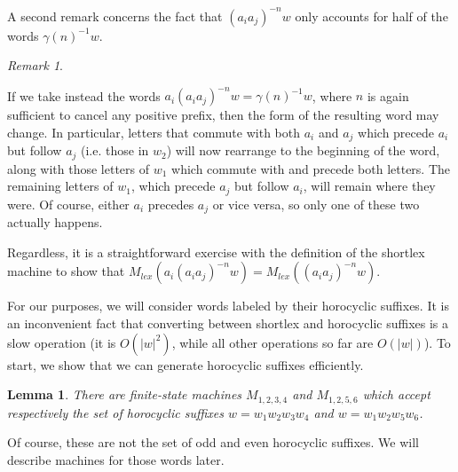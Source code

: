 \documentclass[10pt,a4paper]{amsart}
\newtheorem{lemma}[theorem]{Lemma}
\theoremstyle{definition}
\theoremstyle{remark}
\newtheorem{remark}[theorem]{Remark}
\begin{document}
	A second remark concerns the fact that $(a_ia_j)^{-n}w$ only accounts for half of the words $\gamma(n)^{-1}w$.
	
	\begin{remark}\label{FullConvergence}
		
		If we take instead the words $a_i (a_ia_j)^{-n}w = \gamma(n)^{-1}w$, where $n$ is again sufficient to cancel any positive prefix, then the form of the resulting word may change. In particular, letters that commute with both $a_i$ and $a_j$ which precede $a_i$ but follow $a_j$ (i.e. those in $w_2$) will now rearrange to the beginning of the word, along with those letters of $w_1$ which commute with and precede both letters. The remaining letters of $w_1$, which precede $a_j$ but follow $a_i$, will remain where they were. Of course, either $a_i$ precedes $a_j$ or vice versa, so only one of these two actually happens.
		
		Regardless, it is a straightforward exercise with the definition of the shortlex machine to show that $M_{lex}(a_i (a_ia_j)^{-n}w) = M_{lex}((a_ia_j)^{-n}w)$.
		
	\end{remark}
	
	For our purposes, we will consider words labeled by their horocyclic suffixes. It is an inconvenient fact that converting between shortlex and horocyclic suffixes is a slow operation (it is $O(|w|^2)$, while all other operations so far are $O(|w|)$). To start, we show that we can generate horocyclic suffixes efficiently.
	
	
	\begin{lemma}
		
		There are finite-state machines $M_{1,2,3,4}$ and $M_{1,2,5,6}$ which accept respectively the set of horocyclic suffixes $w=w_1w_2w_3w_4$ and $w=w_1w_2w_5w_6$.
		
	\end{lemma}
	
	Of course, these are not the set of odd and even horocyclic suffixes. We will describe machines for those words later.
	
	
	
\end{document}
